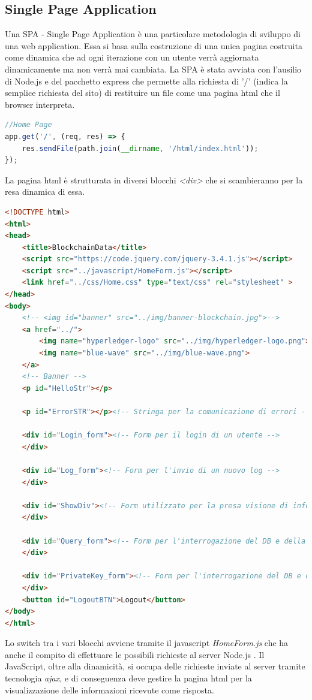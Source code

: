 \documentclass[11pt,a4paper,titlepage,twoside,openright]{report}
\begin{document}
\subsection{Single Page Application}%
Una SPA - Single Page Application è una particolare metodologia di sviluppo di una web application. Essa si basa sulla costruzione di una unica pagina costruita come dinamica che ad ogni iterazione con un utente verrà aggiornata dinamicamente ma non verrà mai cambiata. La SPA è stata avviata con l'ausilio di Node.js e del pacchetto express che permette alla richiesta di '/' (indica la semplice richiesta del sito) di restituire un file come una pagina html che il browser interpreta.
\begin{lstlisting}[language=JavaScript]
//Home Page
app.get('/', (req, res) => {
  	res.sendFile(path.join(__dirname, '/html/index.html'));
});
\end{lstlisting}
La pagina html è strutturata in diversi blocchi \textit{<div>} che si scambieranno per la resa dinamica di essa.
\begin{lstlisting}[language=HTML]
<!DOCTYPE html>
<html>
<head>
	<title>BlockchainData</title>
	<script src="https://code.jquery.com/jquery-3.4.1.js"></script>
	<script src="../javascript/HomeForm.js"></script>
	<link href="../css/Home.css" type="text/css" rel="stylesheet" >
</head>
<body>
	<!-- <img id="banner" src="../img/banner-blockchain.jpg">-->
	<a href="../">
		<img name="hyperledger-logo" src="../img/hyperledger-logo.png">
		<img name="blue-wave" src="../img/blue-wave.png">
	</a>
	<!-- Banner -->
	<p id="HelloStr"></p>

	<p id="ErrorSTR"></p><!-- Stringa per la comunicazione di errori -->
	
	<div id="Login_form"><!-- Form per il login di un utente -->
	</div>
	
	<div id="Log_form"><!-- Form per l'invio di un nuovo log -->
	</div>

	<div id="ShowDiv"><!-- Form utilizzato per la presa visione di informazioni -->
	</div>

	<div id="Query_form"><!-- Form per l'interrogazione del DB e della Blockchain -->
	</div>

	<div id="PrivateKey_form"><!-- Form per l'interrogazione del DB e della Blockchain -->
	</div>
	<button id="LogoutBTN">Logout</button>
</body>
</html>
\end{lstlisting}
Lo switch tra i vari blocchi avviene tramite il javascript \textit{HomeForm.js} che ha anche il compito di effettuare le possibili richieste al server Node.js . Il JavaScript, oltre alla dinamicità, si occupa delle richieste inviate al server tramite tecnologia \textit{ajax}, e di conseguenza deve gestire la pagina html per la visualizzazione delle informazioni ricevute come risposta.
\end{document}
